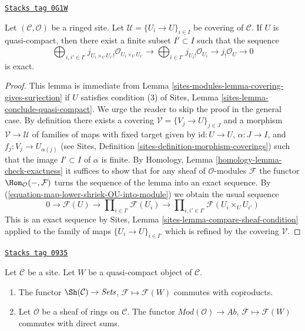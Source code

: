 \begin{lemma}
\label{sites-modules-lemma-silly-quasi-compact}
\href{https://stacks.math.columbia.edu/tag/0G1W}{\texttt{Stacks tag 0G1W}}

Let $(\mathcal{C}, \mathcal{O})$ be a ringed site. Let
$\mathcal{U} = \{U_i \to U\}_{i \in I}$ be covering of $\mathcal{C}$.
If $U$ is quasi-compact, then there exist a finite subset
$I' \subset I$ such that the sequence
$$
\bigoplus\nolimits_{i, i' \in I'}
j_{U_i \times_U U_{i'}!}\mathcal{O}_{U_i \times_U U_{i'}} \to
\bigoplus\nolimits_{i \in I'}
j_{U_i!}\mathcal{O}_{U_i} \to
j_!\mathcal{O}_U \to 0
$$
is exact.
\end{lemma}

\begin{proof}
This lemma is immediate from Lemma \ref{sites-modules-lemma-covering-gives-surjection}
if $U$ satisfies condition (3) of
Sites, Lemma \ref{sites-lemma-conclude-quasi-compact}.
We urge the reader to skip the proof in the general case.
By definition there exists a covering
$\mathcal{V} = \{V_j \to U\}_{j \in J}$ and a morphism
$\mathcal{V} \to \mathcal{U}$ of families of maps with fixed target
given by $\text{id} : U \to U$, $\alpha : J \to I$, and
$f_j : V_j \to U_{\alpha(j)}$
(see Sites, Definition \ref{sites-definition-morphism-coverings})
such that the image $I' \subset I$ of $\alpha$ is finite.
By Homology, Lemma \ref{homology-lemma-check-exactness}
it suffices to show that for any sheaf of $\mathcal{O}$-modules $\mathcal{F}$
the functor $\Hom_\mathcal{O}(-, \mathcal{F})$ turns the sequence
of the lemma into an exact sequence. By
(\ref{equation-map-lower-shriek-OU-into-module})
we obtain the usual sequence
$$
0 \to
\mathcal{F}(U) \to
\prod\nolimits_{i \in I'} \mathcal{F}(U_i) \to
\prod\nolimits_{i, i' \in I'} \mathcal{F}(U_i \times_U U_{i'})
$$
This is an exact sequence by
Sites, Lemma \ref{sites-lemma-compare-sheaf-condition}
applied to the family of maps $\{U_i \to U\}_{i \in I'}$
which is refined by the covering $\mathcal{V}$.
\end{proof}

\begin{lemma}
\label{sites-modules-lemma-sections-over-quasi-compact}
\href{https://stacks.math.columbia.edu/tag/0935}{\texttt{Stacks tag 0935}}

Let $\mathcal{C}$ be a site. Let $W$ be a quasi-compact
object of $\mathcal{C}$.
\begin{enumerate}
\item The functor $\Sh(\mathcal{C}) \to \textit{Sets}$,
$\mathcal{F} \mapsto \mathcal{F}(W)$ commutes with coproducts.
\item Let $\mathcal{O}$ be a sheaf of rings on $\mathcal{C}$. The functor
$\textit{Mod}(\mathcal{O}) \to \textit{Ab}$,
$\mathcal{F} \mapsto \mathcal{F}(W)$
commutes with direct sums.
\end{enumerate}
\end{lemma}

